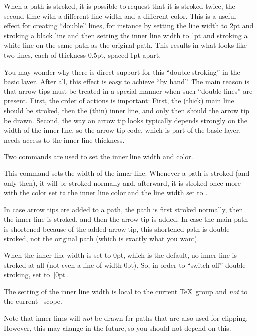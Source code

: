 When a path is stroked, it is possible to request that it is stroked
twice, the second time with a different line width and a different
color. This is a useful effect for creating ``double'' lines, for
instance by setting the line width to 2pt and stroking a black line
and then setting the inner line width to 1pt and stroking a white
line on the same path as the original path. This results in what looks
like two lines, each of thickness 0.5pt, spaced 1pt apart.

You may wonder why there is direct support for this ``double
stroking'' in the basic layer. After all, this effect is easy to
achieve ``by hand''. The main reason is that arrow tips must be
treated in a special manner when such ``double lines'' are
present. First, the order of actions is important: First, the (thick)
main line should be stroked, then the (thin) inner line, and only then
should the arrow tip be drawn. Second, the way an arrow tip looks
typically depends strongly on the width of the inner line, so the
arrow tip code, which is part of the basic layer, needs access to the
inner line thickness.

Two commands are used to set the inner line width and color.

\begin{command}{\pgfsetinnerlinewidth{}}
  This command sets the width of the inner line. Whenever a path is
  stroked (and only then), it will be stroked normally and, afterward,
  it is stroked once more with the color set to the inner line color
  and the line width set to .

  In case arrow tips are added to a path, the path is first stroked
  normally, then the inner line is stroked, and then the arrow tip is
  added. In case the main path is shortened because of the added arrow
  tip, this shortened path is double stroked, not the original path
  (which is exactly what you want).

  When the inner line width is set to 0pt, which is the default, no
  inner line is stroked at all (not even a line of width 0pt). So, in
  order to ``switch off'' double stroking, set 
  to~|0pt|.

  The setting of the inner line width is local to the current \TeX\
  group and \emph{not} to the current \pgfname\ scope.

  Note that inner lines will \emph{not} be drawn for paths that are
  also used for clipping. However, this may change in the future, so
  you should not depend on this.

\begin{codeexample}[]
\begin{pgfpicture}
  \pgfpathmoveto{\pgfpointorigin}
  \pgfpathlineto{\pgfpoint{1cm}{1cm}}
  \pgfpathlineto{\pgfpoint{1cm}{0cm}}
  \pgfsetlinewidth{2pt}
  \pgfsetinnerlinewidth{1pt}
\end{pgfpicture}
\end{codeexample}  
\end{command}


